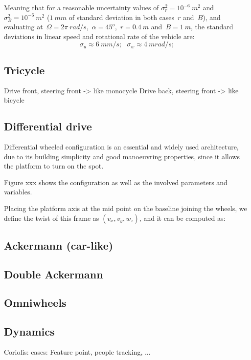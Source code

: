 Meaning that for a reasonable uncertainty values of $\sigma^2_r=10^{-6}\ m^2$ and $\sigma^2_B=10^{-6}\ m^2$ ($1\ mm$ of standard deviation in both cases~$r$ and~$B$), and evaluating at~$\Omega=2\pi\ rad/s$,~$\alpha=45^o$,~$r=0.4\ m$ and~$B=1\ m$, the standard deviations in linear speed and rotational rate of the vehicle are: 
\begin{equation}
 \sigma_u \approx 6\ mm/s ; \ \ \ \sigma_w \approx 4\ mrad/s ;
\end{equation}





\subsection{Tricycle}
Drive front, steering front -> like monocycle
Drive back, steering front -> like bicycle


\subsection{Differential drive}
Differential wheeled configuration is an essential and widely used architecture, due to its building simplicity and good manoeuvring properties, since it allows the platform to turn on the spot. 

Figure xxx shows the configuration as well as the involved parameters and variables. 

Placing the platform axis at the mid point on the baseline joining the wheels, we define the twist of this frame as $(v_x, v_y, w_z)$, and it can be computed as: 

\subsection{Ackermann (car-like)}

\subsection{Double Ackermann}

\subsection{Omniwheels}



\subsection{Dynamics}
Coriolis: cases: Feature point, people tracking, ...


